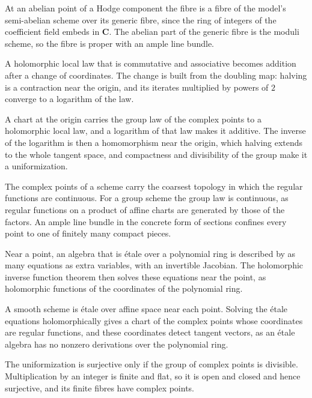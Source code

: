 At an abelian point of a Hodge component the fibre is a fibre of the model's semi-abelian scheme over its generic fibre,
since the ring of integers of the coefficient field embeds in $\mathbf C$. The abelian part of the generic fibre is the moduli
scheme, so the fibre is proper with an ample line bundle.

A holomorphic local law that is commutative and associative becomes addition after a change of coordinates. The change is
built from the doubling map: halving is a contraction near the origin, and its iterates multiplied by powers of $2$ converge
to a logarithm of the law.

A chart at the origin carries the group law of the complex points to a holomorphic local law, and a logarithm of that law
makes it additive. The inverse of the logarithm is then a homomorphism near the origin, which halving extends to the whole
tangent space, and compactness and divisibility of the group make it a uniformization.

The complex points of a scheme carry the coarsest topology in which the regular functions are continuous. For a group scheme
the group law is continuous, as regular functions on a product of affine charts are generated by those of the factors. An
ample line bundle in the concrete form of sections confines every point to one of finitely many compact pieces.

Near a point, an algebra that is \'etale over a polynomial ring is described by as many equations as extra variables, with
an invertible Jacobian. The holomorphic inverse function theorem then solves these equations near the point, as
holomorphic functions of the coordinates of the polynomial ring.

A smooth scheme is \'etale over affine space near each point. Solving the \'etale equations holomorphically gives a chart
of the complex points whose coordinates are regular functions, and these coordinates detect tangent vectors, as an \'etale
algebra has no nonzero derivations over the polynomial ring.

The uniformization is surjective only if the group of complex points is divisible. Multiplication by an integer is finite
and flat, so it is open and closed and hence surjective, and its finite fibres have complex points.

